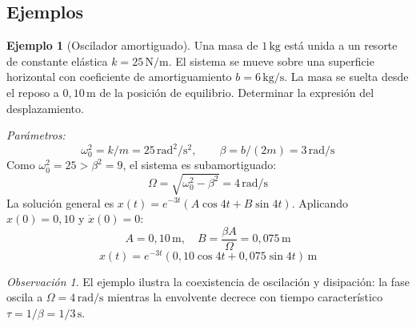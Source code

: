 \documentclass[12pt, a4paper]{article}
\theoremstyle{plain}
\theoremstyle{definition}
\newtheorem{ejemplo}{Ejemplo}[section]
\theoremstyle{remark}
\newtheorem*{observacion}{Observación}
\begin{document}
\subsection{Ejemplos}

\begin{ejemplo}[Oscilador amortiguado]
Una masa de $1\,\mathrm{kg}$ está unida a un resorte de constante elástica
$k = 25\,\mathrm{N/m}$. El sistema se mueve sobre una superficie horizontal con
coeficiente de amortiguamiento $b = 6\,\mathrm{kg/s}$. La masa se suelta desde el
reposo a $0{,}10\,\mathrm{m}$ de la posición de equilibrio. Determinar la expresión del
desplazamiento.

\textit{Parámetros:}
\begin{equation}
  \omega_0^2 = k/m = 25\,\mathrm{rad^2/s^2},\qquad
  \beta = b/(2m) = 3\,\mathrm{rad/s}
\end{equation}
Como $\omega_0^2 = 25 > \beta^2 = 9$, el sistema es subamortiguado:
\begin{equation}
  \Omega = \sqrt{\omega_0^2 - \beta^2} = 4\,\mathrm{rad/s}
\end{equation}
La solución general es $x(t) = e^{-3t}(A\cos 4t + B\sin 4t)$. Aplicando $x(0) = 0{,}10$
y $\dot{x}(0) = 0$:
\begin{equation}
  A = 0{,}10\,\mathrm{m}, \quad B = \frac{\beta A}{\Omega} = 0{,}075\,\mathrm{m}
\end{equation}
\begin{equation}
  \boxed{x(t) = e^{-3t}\!\left(0{,}10\cos 4t + 0{,}075\sin 4t\right)\,\mathrm{m}}
\end{equation}
\begin{observacion}
El ejemplo ilustra la coexistencia de oscilación y disipación: la fase oscila a
$\Omega=4\,\mathrm{rad/s}$ mientras la envolvente decrece con tiempo característico
$\tau=1/\beta=1/3\,\mathrm{s}$.
\end{observacion}
\end{ejemplo}
\end{document}
